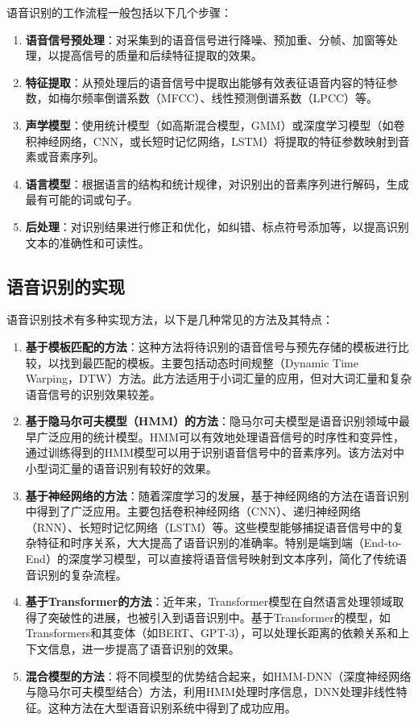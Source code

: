 \documentclass[12pt,hyperref,a4paper,UTF8]{ctexart}
\begin{document}
语音识别的工作流程一般包括以下几个步骤：
\begin{enumerate}
    \item \textbf{语音信号预处理}：对采集到的语音信号进行降噪、预加重、分帧、加窗等处理，以提高信号的质量和后续特征提取的效果。
    \item \textbf{特征提取}：从预处理后的语音信号中提取出能够有效表征语音内容的特征参数，如梅尔频率倒谱系数（MFCC）、线性预测倒谱系数（LPCC）等。
    \item \textbf{声学模型}：使用统计模型（如高斯混合模型，GMM）或深度学习模型（如卷积神经网络，CNN，或长短时记忆网络，LSTM）将提取的特征参数映射到音素或音素序列。
    \item \textbf{语言模型}：根据语言的结构和统计规律，对识别出的音素序列进行解码，生成最有可能的词或句子。
    \item \textbf{后处理}：对识别结果进行修正和优化，如纠错、标点符号添加等，以提高识别文本的准确性和可读性。
\end{enumerate}

\subsection*{语音识别的实现}
语音识别技术有多种实现方法，以下是几种常见的方法及其特点：

\begin{enumerate}
    \item \textbf{基于模板匹配的方法}：这种方法将待识别的语音信号与预先存储的模板进行比较，以找到最匹配的模板。主要包括动态时间规整（Dynamic Time Warping，DTW）方法。此方法适用于小词汇量的应用，但对大词汇量和复杂语音信号的识别效果较差。
    
    \item \textbf{基于隐马尔可夫模型（HMM）的方法}：隐马尔可夫模型是语音识别领域中最早广泛应用的统计模型。HMM可以有效地处理语音信号的时序性和变异性，通过训练得到的HMM模型可以用于识别语音信号中的音素序列。该方法对中小型词汇量的语音识别有较好的效果。
    
    \item \textbf{基于神经网络的方法}：随着深度学习的发展，基于神经网络的方法在语音识别中得到了广泛应用。主要包括卷积神经网络（CNN）、递归神经网络（RNN）、长短时记忆网络（LSTM）等。这些模型能够捕捉语音信号中的复杂特征和时序关系，大大提高了语音识别的准确率。特别是端到端（End-to-End）的深度学习模型，可以直接将语音信号映射到文本序列，简化了传统语音识别的复杂流程。
    
    \item \textbf{基于Transformer的方法}：近年来，Transformer模型在自然语言处理领域取得了突破性的进展，也被引入到语音识别中。基于Transformer的模型，如Transformers和其变体（如BERT、GPT-3），可以处理长距离的依赖关系和上下文信息，进一步提高了语音识别的效果。
    
    \item \textbf{混合模型的方法}：将不同模型的优势结合起来，如HMM-DNN（深度神经网络与隐马尔可夫模型结合）方法，利用HMM处理时序信息，DNN处理非线性特征。这种方法在大型语音识别系统中得到了成功应用。
\end{enumerate}
\end{document}
